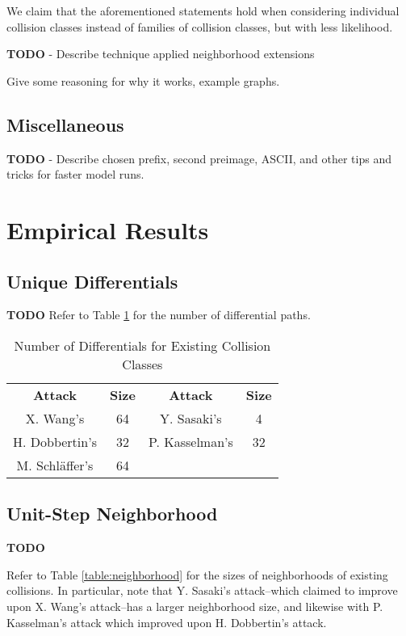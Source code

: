 \documentclass[conference]{IEEEtran}
\begin{document}
We claim that the aforementioned statements hold when considering individual
collision classes instead of families of collision classes, but with less
likelihood.

\textbf{TODO} - Describe technique applied neighborhood extensions

Give some reasoning for why it works, example graphs.


\subsection{Miscellaneous}

\textbf{TODO} - Describe chosen prefix, second preimage, ASCII, and other
tips and tricks for faster model runs.





\section{Empirical Results}
\subsection{Unique Differentials}

\textbf{TODO}
Refer to Table \ref{table:differentials} for the number of differential
paths.

\begin{table}
    \caption{Number of Differentials for Existing Collision Classes}
    \label{table:differentials}
    \begin{tabular}{c c c c}
        \textbf{Attack} & \textbf{Size} & \textbf{Attack} & \textbf{Size} \\
        X. Wang's & 64 & Y. Sasaki's & 4 \\
        H. Dobbertin's & 32 & P. Kasselman's & 32 \\
        M. Schl{\"a}ffer's & 64 & & \\
    \end{tabular}
\end{table}

\subsection{Unit-Step Neighborhood} \label{empirical:neighborhood}

\textbf{TODO}

Refer to Table \ref{table:neighborhood} for the sizes of neighborhoods
of existing collisions. In particular, note that Y. Sasaki's attack--which
claimed to improve upon X. Wang's attack--has a larger neighborhood size, and
likewise with P. Kasselman's attack which improved upon H. Dobbertin's attack.
\end{document}
